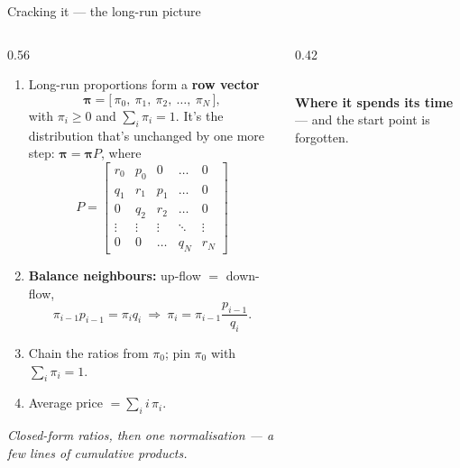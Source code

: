 \documentclass[aspectratio=169,10pt]{beamer}
\newif\ifkick \kickfalse
\newcommand{\kick}[1]{\def\thekicker{#1}\kicktrue}
\begin{document}
\begin{frame}[t]{Cracking it --- the long-run picture}
\kick{Scenario 3 \ \textbullet\ \ tactic: balance the flow}
\begin{columns}[t,onlytextwidth]
  \begin{column}{0.56\textwidth}\footnotesize
    \vspace{-2cm}
    \begin{enumerate}[<+->]\setlength\itemsep{2pt}
      \item Long-run proportions form a \textbf{row vector}
        \[ \boldsymbol\pi = \bigl[\,\pi_0,\ \pi_1,\ \pi_2,\ \ldots,\ \pi_N\,\bigr], \]
        with $\pi_i\ge 0$ and $\sum_i \pi_i = 1$. It's the distribution that's unchanged by one more step: $\boldsymbol\pi = \boldsymbol\pi P$, where
        \vspace{-0.3em}
        {\scriptsize
        \[
        P = \begin{bmatrix}
        r_0 & p_0 & 0 & \dots & 0 \\
        q_1 & r_1 & p_1 & \dots & 0 \\
        0 & q_2 & r_2 & \dots & 0 \\
        \vdots & \vdots & \vdots & \ddots & \vdots \\
        0 & 0 & \dots & q_N & r_N
        \end{bmatrix}
        \]}
        \vspace{-0.3em}
      \item \textbf{Balance neighbours:} up-flow $=$ down-flow,
        \[ \pi_{i-1}p_{i-1}=\pi_i q_i\ \Rightarrow\ \pi_i=\pi_{i-1}\frac{p_{i-1}}{q_i}. \]
      \item Chain the ratios from $\pi_0$; pin $\pi_0$ with $\sum_i\pi_i=1$.
      \item Average price $=\sum_i i\,\pi_i$.
    \end{enumerate}
    \vspace{2pt}
    {\scriptsize\textcolor{cSlate}{\itshape Closed-form ratios, then one normalisation --- a few lines of cumulative products.}}
  \end{column}
  \begin{column}{0.42\textwidth}
    \centering
    \\[1pt]
    {\scriptsize\textcolor{cTeal}{\textbf{Where it spends its time}} --- and the start point is forgotten.}
  \end{column}
\end{columns}
\end{frame}
\end{document}
